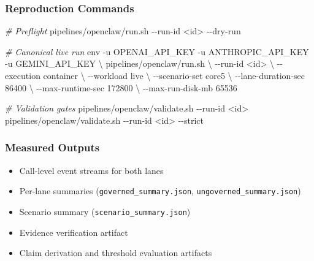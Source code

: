 \documentclass[
]{article}
\newenvironment{Shaded}{}{}
\newcommand{\AttributeTok}[1]{\textcolor[rgb]{0.49,0.56,0.16}{#1}}
\newcommand{\CommentTok}[1]{\textcolor[rgb]{0.38,0.63,0.69}{\textit{#1}}}
\newcommand{\DataTypeTok}[1]{\textcolor[rgb]{0.56,0.13,0.00}{#1}}
\newcommand{\ExtensionTok}[1]{#1}
\newcommand{\FunctionTok}[1]{\textcolor[rgb]{0.02,0.16,0.49}{#1}}
\newcommand{\NormalTok}[1]{#1}
\newcommand{\OperatorTok}[1]{\textcolor[rgb]{0.40,0.40,0.40}{#1}}
\providecommand{\tightlist}{%
  \setlength{\itemsep}{0pt}\setlength{\parskip}{0pt}}
\newenvironment{Shaded}{\begin{snugshade}}{\end{snugshade}}%
\begin{document}
\subsubsection{Reproduction Commands}\label{reproduction-commands}

\begin{Shaded}
\begin{Highlighting}[]
\CommentTok{\# Preflight}
\ExtensionTok{pipelines/openclaw/run.sh} \AttributeTok{{-}{-}run{-}id} \OperatorTok{\textless{}}\NormalTok{id}\OperatorTok{\textgreater{}}\NormalTok{ {-}{-}dry{-}run}

\CommentTok{\# Canonical live run}
\FunctionTok{env} \AttributeTok{{-}u}\NormalTok{ OPENAI\_API\_KEY }\AttributeTok{{-}u}\NormalTok{ ANTHROPIC\_API\_KEY }\AttributeTok{{-}u}\NormalTok{ GEMINI\_API\_KEY }\DataTypeTok{\textbackslash{}}
\NormalTok{pipelines/openclaw/run.sh }\DataTypeTok{\textbackslash{}}
  \AttributeTok{{-}{-}run{-}id} \OperatorTok{\textless{}}\NormalTok{id}\OperatorTok{\textgreater{}} \DataTypeTok{\textbackslash{}}
  \AttributeTok{{-}{-}execution}\NormalTok{ container }\DataTypeTok{\textbackslash{}}
  \AttributeTok{{-}{-}workload}\NormalTok{ live }\DataTypeTok{\textbackslash{}}
  \AttributeTok{{-}{-}scenario{-}set}\NormalTok{ core5 }\DataTypeTok{\textbackslash{}}
  \AttributeTok{{-}{-}lane{-}duration{-}sec}\NormalTok{ 86400 }\DataTypeTok{\textbackslash{}}
  \AttributeTok{{-}{-}max{-}runtime{-}sec}\NormalTok{ 172800 }\DataTypeTok{\textbackslash{}}
  \AttributeTok{{-}{-}max{-}run{-}disk{-}mb}\NormalTok{ 65536}

\CommentTok{\# Validation gates}
\ExtensionTok{pipelines/openclaw/validate.sh} \AttributeTok{{-}{-}run{-}id} \OperatorTok{\textless{}}\NormalTok{id}\OperatorTok{\textgreater{}}
\ExtensionTok{pipelines/openclaw/validate.sh} \AttributeTok{{-}{-}run{-}id} \OperatorTok{\textless{}}\NormalTok{id}\OperatorTok{\textgreater{}}\NormalTok{ {-}{-}strict}
\end{Highlighting}
\end{Shaded}

\subsubsection{Measured Outputs}\label{measured-outputs}

\begin{itemize}
\tightlist
\item
  Call-level event streams for both lanes
\item
  Per-lane summaries (\texttt{governed\_summary.json},
  \texttt{ungoverned\_summary.json})
\item
  Scenario summary (\texttt{scenario\_summary.json})
\item
  Evidence verification artifact
\item
  Claim derivation and threshold evaluation artifacts
\end{itemize}
\end{document}
